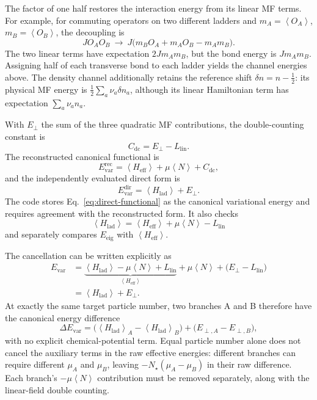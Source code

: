 \documentclass[11pt]{article}
\newcommand{\Hlad}{H_{\mathrm{lad}}}
\newcommand{\Heff}{H_{\mathrm{eff}}}
\newcommand{\mean}[1]{\left\langle #1\right\rangle}
\begin{document}
The factor of one half restores the interaction energy from its linear MF
terms.  For example, for commuting operators on two different ladders and
\(m_A=\mean{O_A}\), \(m_B=\mean{O_B}\), the decoupling is
\begin{equation}
 J O_A O_B\ \longrightarrow\
 J\bigl(m_B O_A+m_A O_B-m_A m_B\bigr).
\end{equation}
The two linear terms have expectation \(2Jm_A m_B\), but the bond energy is
\(Jm_A m_B\).  Assigning half of each transverse bond to each ladder yields
the channel energies above.  The density channel additionally retains the
reference shift \(\delta n=n-\tfrac12\): its physical MF energy is
\(\tfrac12\sum_a\nu_a\delta n_a\), although its linear Hamiltonian term
has expectation \(\sum_a\nu_a n_a\).

With \(E_\perp\) the sum of the three quadratic MF contributions, the
double-counting constant is
\begin{equation}
 C_{\mathrm{dc}}=E_\perp-L_{\mathrm{lin}}.
\end{equation}
The reconstructed canonical functional is
 \begin{equation}
 E_{\mathrm{var}}^{\mathrm{rec}}
 =\mean{\Heff}+\mu\mean N+C_{\mathrm{dc}},
\end{equation}
and the independently evaluated direct form is
\begin{equation}
 E_{\mathrm{var}}^{\mathrm{dir}}=\mean{\Hlad}+E_\perp.
\label{eq:direct-functional}
\end{equation}
The code stores Eq.~\eqref{eq:direct-functional} as the canonical variational
energy and requires agreement with the reconstructed form.  It also checks
\begin{equation}
 \mean{\Hlad}=\mean{\Heff}+\mu\mean N-L_{\mathrm{lin}}
\label{eq:hamiltonian-identity}
\end{equation}
and separately compares \(E_{\mathrm{eig}}\) with \(\mean{\Heff}\).

The cancellation can be written explicitly as
\begin{align}
 E_{\mathrm{var}}
 &=\underbrace{\mean{\Hlad}-\mu\mean N+L_{\mathrm{lin}}}
     _{\mean{\Heff}}
   +\mu\mean N+\bigl(E_\perp-L_{\mathrm{lin}}\bigr)\nonumber\\
 &=\mean{\Hlad}+E_\perp.
\end{align}
At exactly the same target particle number, two branches A and B therefore
have the canonical energy difference
\begin{equation}
 \Delta E_{\mathrm{var}}
 =\bigl(\mean{\Hlad}_A-\mean{\Hlad}_B\bigr)
  +\bigl(E_{\perp,A}-E_{\perp,B}\bigr),
\end{equation}
with no explicit chemical-potential term.  Equal particle number alone does
not cancel the auxiliary terms in the raw effective energies: different
branches can require different \(\mu_A\) and \(\mu_B\), leaving
\(-N_\star(\mu_A-\mu_B)\) in their raw difference.  Each branch's
\(-\mu\mean N\) contribution must be removed separately, along with the
linear-field double counting.
\end{document}
